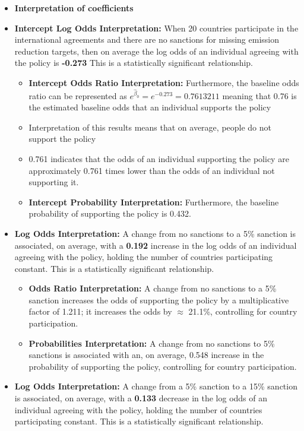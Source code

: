 \documentclass[12pt,letterpaper]{article}
\begin{document}
\begin{enumerate}
\begin{itemize}
	\item \textbf{Interpretation of coefficients}
	\item \textbf{Intercept Log Odds Interpretation:} When 20 countries participate in the international agreements and there are no sanctions for missing emission reduction targets, then on average the log odds of an individual agreeing with the policy is \textbf{-0.273} This is a statistically significant relationship.
		\begin{itemize}

			\item \textbf{Intercept Odds Ratio Interpretation:} Furthermore, the baseline odds ratio can be represented as $e^{\hat{\beta}_0} = e^{-0.273} = 0.7613211$ meaning that 0.76 is the estimated baseline odds that an individual supports the policy
			\item Interpretation of this results means that on average, people do not support the policy
			\item 0.761 indicates that the odds of an individual supporting the policy are approximately 0.761 times lower than the odds of an individual not supporting it.
			\item \textbf{Intercept Probability Interpretation:} Furthermore, the baseline probability of supporting the policy is 0.432.
		\end{itemize}
	\item \textbf{Log Odds Interpretation:} A change from no sanctions to a 5\% sanction is associated, on average, with a \textbf{0.192} increase in the log odds of an individual agreeing with the policy, holding the number of countries participating constant. This is a statistically significant relationship.
		\begin{itemize}
			\item \textbf{Odds Ratio Interpretation:} A change from no sanctions to a 5\% sanction increases the odds of supporting the policy by a multiplicative factor of 1.211; it
			increases the odds by $\approx$ 21.1\%, controlling for country participation.
				\item \textbf{Probabilities Interpretation:} A change from no sanctions to 5\% sanctions is associated with an, on average, 0.548 increase in the probability of supporting the policy, controlling for country participation. 
		\end{itemize}
	\item \textbf{Log Odds Interpretation:} A change from a 5\% sanction to a 15\% sanction is associated, on average, with a \textbf{0.133} decrease in the log odds of an individual agreeing with the policy, holding the number of countries participating constant. This is a statistically significant relationship.

\end{itemize}
\end{enumerate}
\end{document}
